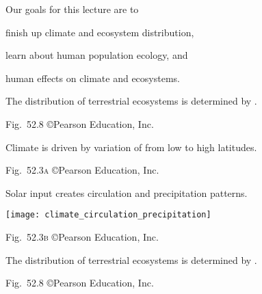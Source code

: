 \documentclass[t]{beamer}
\begin{document}

\begin{frame}{Our goals for this lecture are to}

	\hangpara finish up climate and ecosystem distribution,
	
	\hangpara learn about human population ecology, and

	\hangpara human effects on climate and ecosystems. 
	
	
	
\end{frame}
%

{
\begin{frame}[b]{The distribution of terrestrial ecosystems is determined by .}

	\hfill \tiny Fig.~52.8 \copyright Pearson Education, Inc.
\end{frame}
}
%

{
\begin{frame}[b]{Climate is driven by variation of  from low to high latitudes.}

	\hfill \tiny Fig.~52.3\textsc{a} \copyright Pearson Education, Inc.
\end{frame}
}
%
{
\begin{frame}[t]{Solar input creates circulation and precipitation patterns.}

	\texttt{[image: climate\_circulation\_precipitation]}
	
	\vfilll
	
	\hfill \tiny Fig.~52.3\textsc{b} \copyright Pearson Education, Inc.
\end{frame}
}
%

{
\begin{frame}[b]{The distribution of terrestrial ecosystems is determined by .}

	\hfill \tiny Fig.~52.8 \copyright Pearson Education, Inc.
\end{frame}
}
%
\end{document}
